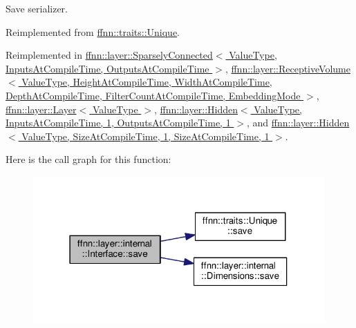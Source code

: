 Save serializer. 



Reimplemented from \hyperlink{classffnn_1_1traits_1_1_unique_ad8be6fcb9a7519603b2aab19b3c6d593}{ffnn\-::traits\-::\-Unique}.



Reimplemented in \hyperlink{classffnn_1_1layer_1_1_sparsely_connected_aa8ae358e7cf06b58f3d33be2851d0260}{ffnn\-::layer\-::\-Sparsely\-Connected$<$ Value\-Type, Inputs\-At\-Compile\-Time, Outputs\-At\-Compile\-Time $>$}, \hyperlink{classffnn_1_1layer_1_1_receptive_volume_a9f813e0c5c60d572a296b8ec1fc25086}{ffnn\-::layer\-::\-Receptive\-Volume$<$ Value\-Type, Height\-At\-Compile\-Time, Width\-At\-Compile\-Time, Depth\-At\-Compile\-Time, Filter\-Count\-At\-Compile\-Time, Embedding\-Mode $>$}, \hyperlink{classffnn_1_1layer_1_1_layer_ac265fc929a178b111337226dd1cb62b6}{ffnn\-::layer\-::\-Layer$<$ Value\-Type $>$}, \hyperlink{classffnn_1_1layer_1_1_hidden_a98305185267a0f7953f1b53c4bce4cf6}{ffnn\-::layer\-::\-Hidden$<$ Value\-Type, Inputs\-At\-Compile\-Time, 1, Outputs\-At\-Compile\-Time, 1 $>$}, and \hyperlink{classffnn_1_1layer_1_1_hidden_a98305185267a0f7953f1b53c4bce4cf6}{ffnn\-::layer\-::\-Hidden$<$ Value\-Type, Size\-At\-Compile\-Time, 1, Size\-At\-Compile\-Time, 1 $>$}.



Here is the call graph for this function\-:
\nopagebreak
\begin{figure}[H]
\begin{center}
\leavevmode
\includegraphics[width=316pt]{classffnn_1_1layer_1_1internal_1_1_interface_a417d6fda112fdffed8091b0ebd78ed97_cgraph}
\end{center}
\end{figure}


